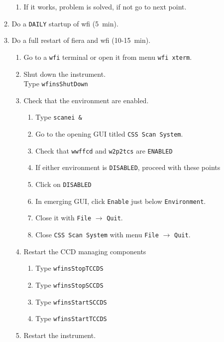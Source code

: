 \documentclass[11pt,fleqn]{book} %
\begin{document}
\begin{enumerate}
\begin{enumerate}
\begin{enumerate}
           \item If it works, problem is solved, if not go to next point.
        \end{enumerate}
      \item Do a \texttt{DAILY} startup of \gls{wfi} (5~min).
      \item\label{list:wfifierarestart} Do a full restart of \gls{fiera} and \gls{wfi} (10-15~min).
        \begin{enumerate}
          \item Go to a \texttt{wfi} terminal or open it from menu \texttt{wfi xterm}.
          \item Shut down the instrument.\\
                Type \texttt{wfinsShutDown}
          \item Check that the environment are enabled.
             \begin{enumerate}
               \item Type \texttt{scanei \&} 
               \item Go to the opening GUI titled \texttt{CSS Scan System}.
               \item Check that \texttt{wwffcd} and \texttt{w2p2tcs} are \texttt{ENABLED}
               \item If either environment is \texttt{DISABLED}, proceed with these points
               \item Click on \texttt{DISABLED}
               \item In emerging GUI, click \texttt{Enable} just below \texttt{Environment}.
               \item Close it with \texttt{File} $\rightarrow$ \texttt{Quit}.
               \item Close \texttt{CSS Scan System} with menu \texttt{File} $\rightarrow$ \texttt{Quit}.
            \end{enumerate} 
          \item Restart the CCD managing components
             \begin{enumerate} 
               \item Type \texttt{wfinsStopTCCDS}
               \item Type \texttt{wfinsStopSCCDS}
               \item Type \texttt{wfinsStartSCCDS}
               \item Type \texttt{wfinsStartTCCDS}
             \end{enumerate}
          \item Restart the instrument.\\

\end{enumerate}
\end{enumerate}
\end{enumerate}
\end{document}

